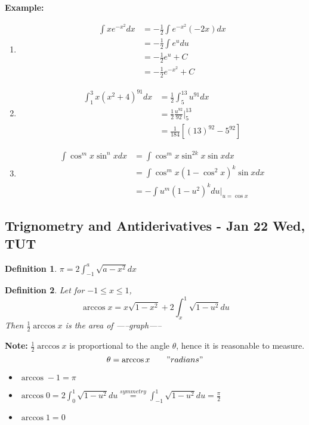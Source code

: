 \documentclass[12pt]{article}
\theoremstyle{plain}
\newtheorem{definition}{Definition}[subsection]
\begin{document}
	{\color{Brown}
	\textbf{Example: }
	\begin{enumerate}
		\item 
			\begin{align*}
			\int xe^{-x^2} dx 
			&= -\frac12 \int e^{-x^2} (-2x) dx\\
			&= -\frac12 \int e^u du \\
			&= -\frac12 e^u + C \\
			&= -\frac12 e^{-x^2} + C
			\end{align*}
			
		\item 
			\begin{align*}
				\int_1^3 x(x^2+4)^{91} dx
				&= \frac 12 \int_5^{13} u^{91} dx\\
				&= \frac 12 \frac{u^{92}}{92} \vert^{13}_5 \\
				&= \frac1{184} [(13)^{92}-5^{92}]
			\end{align*}

		\item 
			\begin{align*}
				\int \cos^m x \sin^n x dx \tag{n \ odd}
				&= \int \cos^m x \sin^{2k} x \sin x dx\\
				&= \int \cos^m x(1-\cos^2 x)^k \sin x dx
				\tag{$ u = \cos x, \  du = -\sin x dx$}\\
				&= -\int u^m(1-u^2)^k du \vert_{u=\cos x}
			\end{align*}
	\end{enumerate}}

	\newpage
	\subsection{Trignometry and Antiderivatives - Jan 22 Wed, TUT}
	\begin{definition}
		$\pi = 2\int_{-1}^a \sqrt{a-x^2}dx$ \\
	\end{definition}

	\begin{definition}
		Let for $-1\leq x\leq 1$, 
		\[
			\arccos x = x \sqrt{1-x^2} + 2\int_x^1 \sqrt{1-u^2} du
		\]
		Then $\frac12 \arccos x$ is the area of 
		-----graph-----
	\end{definition}

	\textbf{Note:} $\frac12\arccos x$ is proportional to the angle $\theta$,
	hence it is reasonable to measure. 
	\[
		\theta = \arccos x \qquad "radians"
	\]
	\begin{itemize}
		\item $\arccos -1 = \pi$
		\item $\arccos 0 = 2\int_0^1 \sqrt{1-u^2} du \overset{symmetry}{=}
			\int_{-1}^1 \sqrt{1-u^2} du = \frac{\pi}2$
		\item $\arccos 1 = 0$
	\end{itemize}
	
\end{document}
